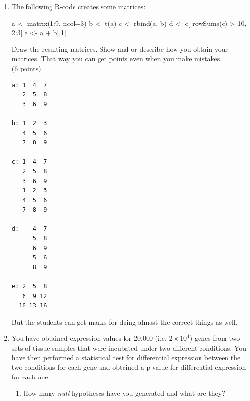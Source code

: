 \documentclass[11pt]{article}
\begin{document}
\begin{enumerate}
\item The following R-code creates some matrices:

  \begin{rcode}
    a <- matrix(1:9, ncol=3)
    b <- t(a)
    c <- rbind(a, b)
    d <- c[ rowSums(c) > 10, 2:3]
    e <- a + b[,1]
  \end{rcode}
  Draw the resulting matrices. Show and or describe how you obtain your
  matrices. That way you can get points even when you make mistakes.\\
  (6 points)

\begin{Notes}
\begin{verbatim}
a: 1  4  7
   2  5  8
   3  6  9

b: 1  2  3
   4  5  6
   7  8  9

c: 1  4  7
   2  5  8
   3  6  9
   1  2  3
   4  5  6
   7  8  9

d:    4  7
      5  8
      6  9
      5  6
      8  9

e: 2  5  8
   6  9 12
  10 13 16
\end{verbatim}
But the students can get marks for doing almost the correct things as well.
\end{Notes}

\item You have obtained expression values for 20,000 (i.e. $2 \times 10^4$) genes from two sets of tissue samples
  that were incubated under two different conditions. You have then performed
  a statistical test for differential expression between the two conditions
  for each gene and obtained a p-value for differential expression for each one.
  \begin{enumerate}
  \item How many \textit{null} hypotheses have you generated and what are they?


\end{enumerate}
\end{enumerate}
\end{document}
